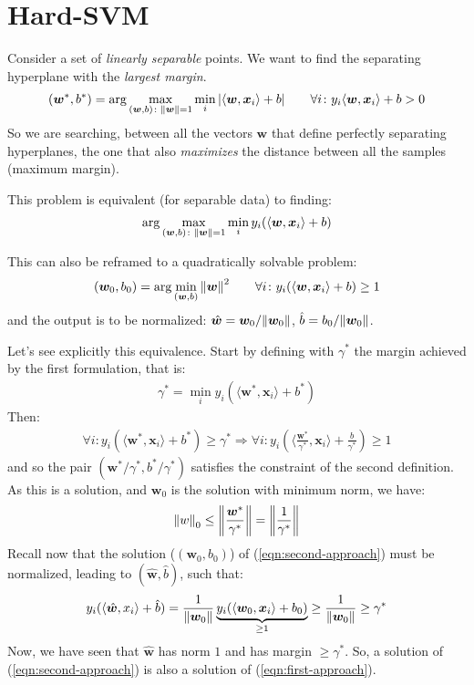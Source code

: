 \documentclass[../template.tex]{subfiles}
\begin{document}
\section{Hard-SVM}
Consider a set of \textit{linearly separable} points. We want to find the separating hyperplane with the \textit{largest margin}.
\begin{align*}
   (\bm{w}^*, b^*) =  \arg \max_{(\bm{w}, b) \colon \norm{\bm{w}} = 1} \min_i |\langle \bm{w}, \bm{x}_i \rangle + b| \qquad \forall i \colon y_i \langle \bm{w}, \bm{x}_i \rangle + b > 0
   \label{eqn:first-approach}
\end{align*}
So we are searching, between all the vectors $\bm{w}$ that define perfectly separating hyperplanes, the one that also \textit{maximizes} the distance between all the samples (maximum margin).

This problem is equivalent (for separable data) to finding:
\begin{align*}
    \arg\max_{(\bm{w}, b) \colon \norm{\bm{w}} = 1} \min_i y_i(\langle \bm{w}, \bm{x}_i \rangle + b)
\end{align*}
 
This can also be reframed to a quadratically solvable problem:
\begin{align*}
    (\bm{w}_0, b_0) = \arg\min_{(\bm{w}, b)} \norm{\bm{w}}^2 \qquad \forall i \colon y_i (\langle \bm{w}, \bm{x}_i \rangle + b ) \geq 1
    \label{eqn:second-approach}
\end{align*}
and the output is to be normalized: $\hat{\bm{w}} = \bm{w}_0/\norm{\bm{w}_0}$, $\hat{b} = b_0/\norm{\bm{w}_0}$.

Let's see explicitly this equivalence. Start by defining with $\gamma^*$ the margin achieved by the first formulation, that is:
\begin{align*}
    \gamma ^* = \min_i y_i (\langle \bm{w}^*, \bm{x}_i \rangle + b^*)
\end{align*} 
Then:
\begin{align*}
    \forall i \colon y_i ( \langle \bm{w}^*, \bm{x}_i \rangle + b^*) \geq \gamma^* \Rightarrow \forall i\colon y_i \left(\langle \frac{\bm{w}^*}{\gamma^*}, \bm{x}_i  \rangle + \frac{b}{\gamma^*} \right) \geq 1
\end{align*}
and so the pair $(\bm{w}^*/\gamma^*, b^*/\gamma^*)$ satisfies the constraint of the second definition. As this is a solution, and $\bm{w}_0$ is the solution with minimum norm, we have:
\begin{align*}
    \norm{w}_0 \leq \norm{\frac{\bm{w}^*}{\gamma^*} } = \norm{\frac{1}{\gamma^*} }
\end{align*}  
Recall now that the solution ($(\bm{w}_0, b_0)$) of (\ref{eqn:second-approach}) must be normalized, leading to $(\hat{\bm{w}}, \hat{b})$, such that:
\begin{align*}
    y_i(\langle \hat{\bm{w}}, x_i \rangle + \hat{b}) = \frac{1}{\norm{\bm{w}_0}} \underbrace{y_i (\langle \bm{w}_0, \bm{x}_i \rangle + b_0)}_{\geq 1}  \geq \frac{1}{\norm{\bm{w}_0}} \geq \gamma^*  
\end{align*} 
Now, we have seen that $\hat{\bm{w}}$ has norm $1$ and has margin $\geq \gamma^*$. So, a solution of (\ref{eqn:second-approach}) is also a solution of (\ref{eqn:first-approach}).   
\end{document}
